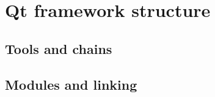 \section{Qt framework structure}\label{section:qtstructure}

\subsection{Tools and chains}

\subsection{Modules and linking}